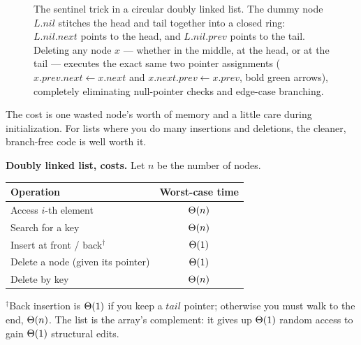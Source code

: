 \begin{figure}[H]
\caption{The sentinel trick in a circular doubly linked list. The dummy node $L.\mathit{nil}$ stitches the head and tail together into a closed ring: $L.\mathit{nil}.\mathit{next}$ points to the head, and $L.\mathit{nil}.\mathit{prev}$ points to the tail. Deleting any node $x$ --- whether in the middle, at the head, or at the tail --- executes the exact same two pointer assignments ($x.\mathit{prev}.\mathit{next} \gets x.\mathit{next}$ and $x.\mathit{next}.\mathit{prev} \gets x.\mathit{prev}$, bold green arrows), completely eliminating null-pointer checks and edge-case branching.}
\label{ch10:fig-sentinel}
\end{figure}

The cost is one wasted node's worth of memory and a little care during initialization. For lists where you do many insertions and deletions, the cleaner, branch-free code is well worth it.

\begin{complexitybox}
\textbf{Doubly linked list, costs.} Let $n$ be the number of nodes.
\begin{center}
\begin{tabular}{lc}
\toprule
Operation & Worst-case time \\
\midrule
Access $i$-th element & $\Theta(n)$ \\
Search for a key & $\Theta(n)$ \\
Insert at front / back$^\dagger$ & $\Theta(1)$ \\
Delete a node (given its pointer) & $\Theta(1)$ \\
Delete by key & $\Theta(n)$ \\
\bottomrule
\end{tabular}
\end{center}
$^\dagger$Back insertion is $\Theta(1)$ if you keep a $tail$ pointer; otherwise you must walk to the end, $\Theta(n)$. The list is the array's complement: it gives up $\Theta(1)$ random access to gain $\Theta(1)$ structural edits.
\end{complexitybox}

